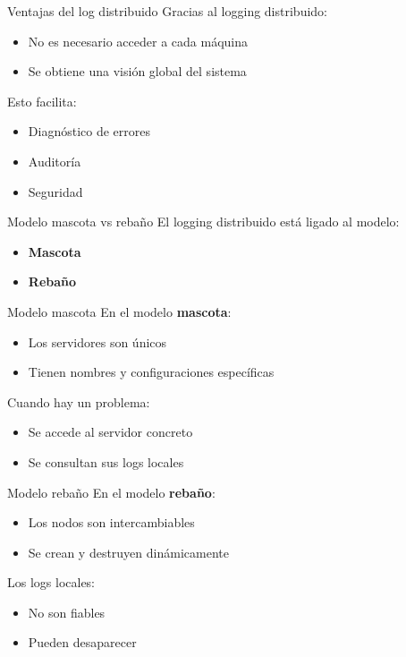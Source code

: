 \documentclass{beamer}
\begin{document}
\begin{frame}{Ventajas del log distribuido}
Gracias al logging distribuido:
\begin{itemize}
    \item No es necesario acceder a cada máquina
    \item Se obtiene una visión global del sistema
\end{itemize}

\vspace{0.3cm}
Esto facilita:
\begin{itemize}
    \item Diagnóstico de errores
    \item Auditoría
    \item Seguridad
\end{itemize}
\end{frame}

\begin{frame}{Modelo mascota vs rebaño}
El logging distribuido está ligado al modelo:
\begin{itemize}
    \item \textbf{Mascota}
    \item \textbf{Rebaño}
\end{itemize}
\end{frame}

\begin{frame}{Modelo mascota}
En el modelo \textbf{mascota}:
\begin{itemize}
    \item Los servidores son únicos
    \item Tienen nombres y configuraciones específicas
\end{itemize}

\vspace{0.3cm}
Cuando hay un problema:
\begin{itemize}
    \item Se accede al servidor concreto
    \item Se consultan sus logs locales
\end{itemize}
\end{frame}

\begin{frame}{Modelo rebaño}
En el modelo \textbf{rebaño}:
\begin{itemize}
    \item Los nodos son intercambiables
    \item Se crean y destruyen dinámicamente
\end{itemize}

\vspace{0.3cm}
Los logs locales:
\begin{itemize}
    \item No son fiables
    \item Pueden desaparecer
\end{itemize}
\end{frame}
\end{document}
